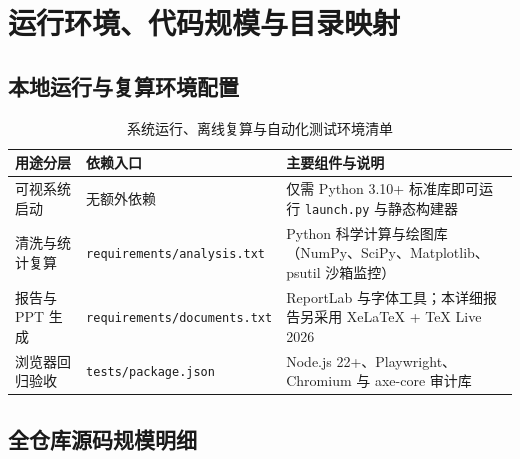 \chapter{运行环境、代码规模与目录映射}\label{app:environment}

\section{本地运行与复算环境配置}

\begin{table}[!htbp]
\centering
\caption{系统运行、离线复算与自动化测试环境清单}\label{tab:env-stack}
\ReportTableStyle\renewcommand{\arraystretch}{1.0}
\begin{tabularx}{\linewidth}{@{}>{\raggedright\arraybackslash}p{2.8cm} >{\raggedright\arraybackslash}p{3.0cm} >{\raggedright\arraybackslash}X@{}}
\toprule
\textbf{用途分层} & \textbf{依赖入口} & \textbf{主要组件与说明} \\
\midrule
可视系统启动 & 无额外依赖 & 仅需 Python 3.10+ 标准库即可运行 \texttt{launch.py} 与静态构建器 \\
清洗与统计复算 & \texttt{requirements/analysis.txt} & Python 科学计算与绘图库（NumPy、SciPy、Matplotlib、psutil 沙箱监控） \\
报告与 PPT 生成 & \texttt{requirements/documents.txt} & ReportLab 与字体工具；本详细报告另采用 XeLaTeX + TeX Live 2026 \\
浏览器回归验收 & \texttt{tests/package.json} & Node.js 22+、Playwright、Chromium 与 axe-core 审计库 \\
\bottomrule
\end{tabularx}
\end{table}

\section{全仓库源码规模明细}

